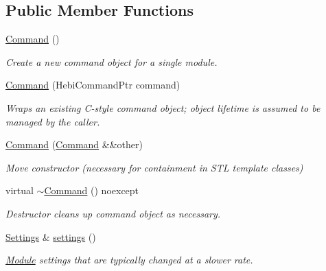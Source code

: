 \subsection*{Public Member Functions}
\begin{DoxyCompactItemize}
\item 
\mbox{\label{classhebi_1_1Command_a8d9766d1a77d76854b1964f57f4a8661}} 
\hyperlink{classhebi_1_1Command_a8d9766d1a77d76854b1964f57f4a8661}{Command} ()
\begin{DoxyCompactList}\small\item\em Create a new command object for a single module. \end{DoxyCompactList}\item 
\hyperlink{classhebi_1_1Command_a8f1e2bbe57e74cac0b3a6adf83634308}{Command} (Hebi\+Command\+Ptr command)
\begin{DoxyCompactList}\small\item\em Wraps an existing C-\/style command object; object lifetime is assumed to be managed by the caller. \end{DoxyCompactList}\item 
\mbox{\label{classhebi_1_1Command_a08f198d16c0e5c229d86471fadec3049}} 
\hyperlink{classhebi_1_1Command_a08f198d16c0e5c229d86471fadec3049}{Command} (\hyperlink{classhebi_1_1Command}{Command} \&\&other)
\begin{DoxyCompactList}\small\item\em Move constructor (necessary for containment in S\+TL template classes) \end{DoxyCompactList}\item 
\mbox{\label{classhebi_1_1Command_a3e69178a5c04e295f55cca8c90bc58f4}} 
virtual \hyperlink{classhebi_1_1Command_a3e69178a5c04e295f55cca8c90bc58f4}{$\sim$\+Command} () noexcept
\begin{DoxyCompactList}\small\item\em Destructor cleans up command object as necessary. \end{DoxyCompactList}\item 
\mbox{\label{classhebi_1_1Command_aab5f37fe874acc28889f148bc985b7a5}} 
\hyperlink{classhebi_1_1Command_1_1Settings}{Settings} \& \hyperlink{classhebi_1_1Command_aab5f37fe874acc28889f148bc985b7a5}{settings} ()
\begin{DoxyCompactList}\small\item\em \hyperlink{classhebi_1_1Module}{Module} settings that are typically changed at a slower rate. \end{DoxyCompactList}\item 

\end{DoxyCompactItemize}
